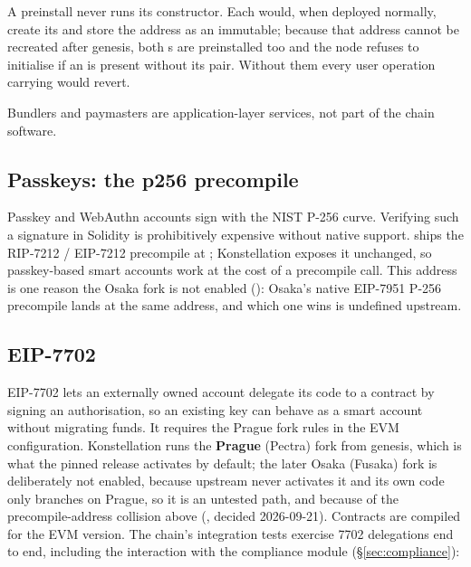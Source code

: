 A preinstall never runs its constructor. Each  would, when
deployed normally, create its  and store the address as an
immutable; because that address cannot be recreated after genesis, both
s are preinstalled too and the node refuses to initialise
if an  is present without its pair. Without them every user
operation carrying  would revert.

Bundlers and paymasters are application-layer services, not part of the chain
software. 

\subsection{Passkeys: the p256 precompile}

Passkey and WebAuthn accounts sign with the NIST P-256 curve. Verifying such a
signature in Solidity is prohibitively expensive without native support.
 ships the RIP-7212 / EIP-7212  precompile at
; Konstellation exposes it
unchanged, so passkey-based smart accounts work at the cost of a precompile
call. This address is one reason the Osaka fork is not enabled
(): Osaka's native EIP-7951 P-256 precompile lands at the same
address, and which one wins is undefined upstream.

\subsection{EIP-7702}

EIP-7702 lets an externally owned account delegate its code to a contract by
signing an authorisation, so an existing key can behave as a smart account
without migrating funds. It requires the Prague fork rules in the EVM
configuration. Konstellation runs the \textbf{Prague} (Pectra) fork from
genesis, which is what the pinned  release activates by
default; the later Osaka (Fusaka) fork is deliberately not enabled, because
upstream never activates it and its own code only branches on Prague, so it is
an untested path, and because of the precompile-address collision above
(, decided 2026-09-21). Contracts are compiled for the
 EVM version. The chain's integration tests
exercise 7702 delegations end to end, including the interaction with the
compliance module (\S\ref{sec:compliance}):

